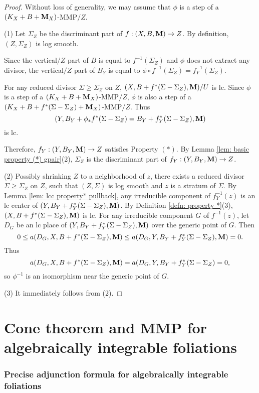 \documentclass[11pt]{amsart}
\numberwithin{equation}{section}
\newcommand{\Mm}{{\bf{M}}}
\theoremstyle{definition}
\theoremstyle{definition}
\theoremstyle{definition}
\begin{document}
\begin{proof}
Without loss of generality, we may assume that $\phi$ is a step of a $(K_X+B+\Mm_X)$-MMP$/Z$. 

(1) Let $\Sigma_Z$ be the discriminant part of $f: (X,B,\Mm)\rightarrow Z$. By definition, $(Z,\Sigma_Z)$ is log smooth. 

Since the vertical$/Z$ part of $B$ is equal to $f^{-1}(\Sigma_Z)$ and $\phi$ does not extract any divisor, the vertical$/Z$ part of $B_Y$ is equal to $\phi\circ f^{-1}(\Sigma_Z)=f_Y^{-1}(\Sigma_Z)$.

For any reduced divisor $\Sigma\geq\Sigma_Z$ on $Z$, $(X,B+f^*(\Sigma-\Sigma_Z),\Mm)/U$ is lc. Since $\phi$ is a step of a $(K_X+B+\Mm_X)$-MMP$/Z$, $\phi$ is also a step of a $(K_X+B+f^*(\Sigma-\Sigma_Z)+\Mm_X)$-MMP$/Z$. Thus 
$$(Y,B_Y+\phi_*f^*(\Sigma-\Sigma_Z)=B_Y+f_Y^*(\Sigma-\Sigma_Z),\Mm)$$
is lc.

Therefore, $f_Y: (Y,B_Y,\Mm)\rightarrow Z$ satisfies Property $(*)$. By Lemma \ref{lem: basic property (*) gpair}(2), $\Sigma_Z$ is the discriminant part of $f_Y: (Y,B_Y,\Mm)\rightarrow Z$.

(2) Possibly shrinking $Z$ to a neighborhood of $z$, there exists a reduced divisor $\Sigma\geq\Sigma_Z$ on $Z$, such that $(Z,\Sigma)$ is log smooth and $z$ is a stratum of $\Sigma$. By Lemma \ref{lem: lcc property* pullback}, any irreducible component of $f_Y^{-1}(z)$ is an lc center of $(Y,B_Y+f_Y^*(\Sigma-\Sigma_Z),\Mm)$. By Definition \ref{defn: property *}(3), $(X,B+f^*(\Sigma-\Sigma_Z),\Mm)$ is lc. For any irreducible component $G$ of $f^{-1}(z)$, let $D_G$ be an lc place of $(Y,B_Y+f_Y^*(\Sigma-\Sigma_Z),\Mm)$ over the generic point of $G$. Then
$$0\leq a(D_G,X,B+f^*(\Sigma-\Sigma_Z),\Mm)\leq a(D_G,Y,B_Y+f_Y^*(\Sigma-\Sigma_Z),\Mm)=0.$$
Thus
$$a(D_G,X,B+f^*(\Sigma-\Sigma_Z),\Mm)=a(D_G,Y,B_Y+f_Y^*(\Sigma-\Sigma_Z)=0,$$
so $\phi^{-1}$ is an isomorphism near the generic point of $G$.

(3) It immediately follows from (2).
\end{proof}




\part{Cone theorem and MMP for algebraically integrable foliations}\label{part:cone}

\section{Precise adjunction formula for algebraically integrable foliations}\label{sec: adjunction}
\end{document}
